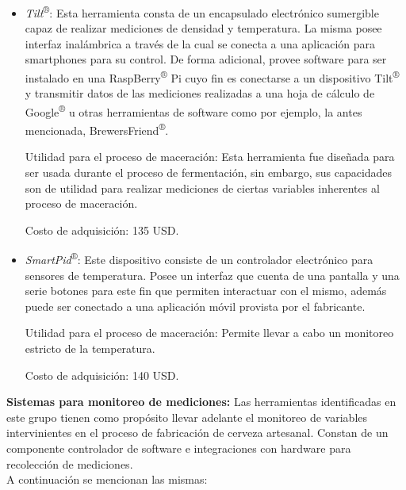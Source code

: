     \begin{itemize}
        \item \textit{Tilt}\textsuperscript{®}: Esta herramienta consta de un encapsulado electrónico sumergible capaz de realizar mediciones de densidad y temperatura. La misma posee interfaz inalámbrica a través de la cual se conecta a una aplicación para smartphones para su control. De forma adicional, provee software para ser instalado en una RaspBerry\textsuperscript{®} Pi cuyo fin es conectarse a un dispositivo Tilt\textsuperscript{®} y transmitir datos de las mediciones realizadas a una hoja de cálculo de Google\textsuperscript{®} u otras herramientas de software como por ejemplo, la antes mencionada,  BrewersFriend\textsuperscript{®}.
        \par
        Utilidad para el proceso de maceración: Esta herramienta fue diseñada para ser usada durante el proceso de fermentación, sin embargo, sus capacidades son de utilidad para realizar mediciones de ciertas variables inherentes al proceso de maceración.
        \par
        Costo de adquisición: 135 USD.
        
        \item{\textit{SmartPid}\textsuperscript{®}}: Este dispositivo consiste de un controlador electrónico para sensores de temperatura. Posee un interfaz que cuenta de una pantalla y una serie botones para este fin que permiten interactuar con el mismo, además puede ser conectado a una aplicación móvil provista por el fabricante.
        \par
        Utilidad para el proceso de maceración: Permite llevar a cabo un monitoreo estricto de la temperatura. 
        \par
        Costo de adquisición: 140 USD.
        
    \end{itemize}
    \par
    \textbf{Sistemas para monitoreo de mediciones:}
    Las herramientas identificadas en este grupo tienen como propósito llevar adelante el monitoreo de variables intervinientes en el proceso de fabricación de cerveza artesanal. Constan de un componente controlador de software e integraciones con hardware para recolección de mediciones.\\
    A continuación se mencionan las mismas:\\
